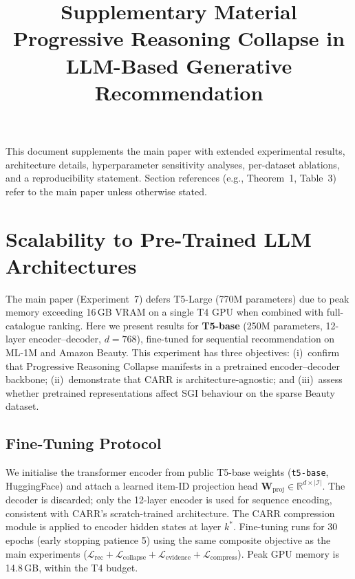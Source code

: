 \documentclass[letterpaper,10pt]{article}
\title{\textbf{Supplementary Material}\\[4pt]
\large Progressive Reasoning Collapse in LLM-Based Generative Recommendation}
\date{}
\begin{document}
\maketitle

\noindent This document supplements the main paper with extended experimental results, architecture details, hyperparameter sensitivity analyses, per-dataset ablations, and a reproducibility statement. Section references (e.g., Theorem~1, Table~3) refer to the main paper unless otherwise stated.

\section{Scalability to Pre-Trained LLM Architectures}
\label{sec:supp-t5}

The main paper (Experiment~7) defers T5-Large (770M parameters) due to peak memory exceeding 16\,GB VRAM on a single T4 GPU when combined with full-catalogue ranking. Here we present results for \textbf{T5-base} (250M parameters, 12-layer encoder--decoder, $d=768$), fine-tuned for sequential recommendation on ML-1M and Amazon Beauty. This experiment has three objectives: (i)~confirm that Progressive Reasoning Collapse manifests in a pretrained encoder--decoder backbone; (ii)~demonstrate that CARR is architecture-agnostic; and (iii)~assess whether pretrained representations affect SGI behaviour on the sparse Beauty dataset.

\subsection{Fine-Tuning Protocol}

We initialise the transformer encoder from public T5-base weights (\texttt{t5-base}, HuggingFace) and attach a learned item-ID projection head $\mathbf{W}_{\mathrm{proj}} \in \mathbb{R}^{d \times |\mathcal{I}|}$. The decoder is discarded; only the 12-layer encoder is used for sequence encoding, consistent with CARR's scratch-trained architecture. The CARR compression module is applied to encoder hidden states at layer $k^*$. Fine-tuning runs for 30 epochs (early stopping patience 5) using the same composite objective as the main experiments ($\mathcal{L}_{\mathrm{rec}} + \mathcal{L}_{\mathrm{collapse}} + \mathcal{L}_{\mathrm{evidence}} + \mathcal{L}_{\mathrm{compress}}$). Peak GPU memory is 14.8\,GB, within the T4 budget.
\end{document}
